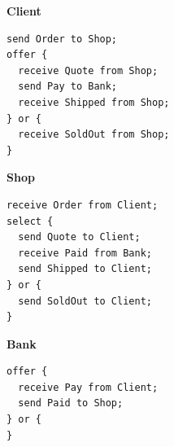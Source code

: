\noindent\textbf{Client}
\begin{lstlisting}[language={}]
send Order to Shop;
offer {
  receive Quote from Shop;
  send Pay to Bank;
  receive Shipped from Shop;
} or {
  receive SoldOut from Shop;
}
\end{lstlisting}

\noindent\textbf{Shop}
\begin{lstlisting}[language={}]
receive Order from Client;
select {
  send Quote to Client;
  receive Paid from Bank;
  send Shipped to Client;
} or {
  send SoldOut to Client;
}
\end{lstlisting}

\noindent\textbf{Bank}
\begin{lstlisting}[language={}]
offer {
  receive Pay from Client;
  send Paid to Shop;
} or {
}
\end{lstlisting}
